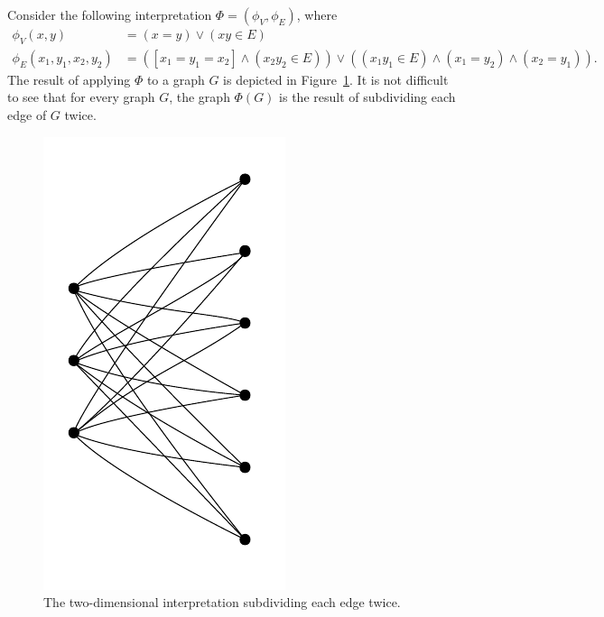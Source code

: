 \begin{example}\label{ex:subdivide}
Consider the following interpretation $\Phi=(\phi_V,\phi_E)$, 
where 
	\begin{align*}
		\phi_V(x,y)&=(x=y)\lor (xy\in E)\\
		\phi_E(x_1,y_1,x_2,y_2)&=([x_1=y_1=x_2]\land (x_2y_2\in E))\lor ((x_1y_1\in E)\land(x_1=y_2)\land (x_2=y_1)).
	\end{align*}
The result of applying $\Phi$ to a graph $G$ is depicted in Figure~\ref{fig:int-subdivide}. It is not difficult to see that for every graph $G$, the graph $\Phi(G)$ is the result of subdividing each edge of $G$
twice. 

\begin{figure}[h]
  \centering
	    \includegraphics[scale=0.3,page=10]{pictures.pdf}
  \caption{The two-dimensional interpretation subdividing each edge twice.}
  \label{fig:int-subdivide}
\end{figure}
\end{example}

